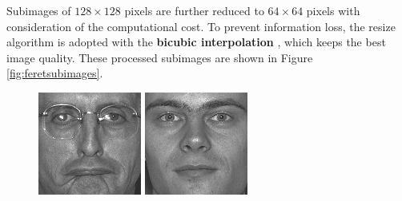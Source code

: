Subimages of $128\times 128$ pixels are further reduced to $64\times 64$ pixels with consideration of the computational cost. To prevent information loss, the resize algorithm is adopted with the \textbf{bicubic interpolation} \cite{Keys1981}, which keeps the best image quality. These processed subimages are shown in \mbox{Figure} \ref{fig:feretsubimages}.
\begin{figure}[ht]
 \begin{center}
  \includegraphics[width=\columnwidth/10]{ch5/figures/feret1.jpg}
  \includegraphics[width=\columnwidth/10]{ch5/figures/feret2.jpg}

\end{center}
\end{figure}
